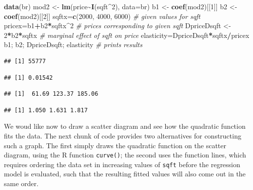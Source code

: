 \documentclass[
]{book}
\newenvironment{Shaded}{\begin{snugshade}}{\end{snugshade}}
\newcommand{\AttributeTok}[1]{\textcolor[rgb]{0.13,0.29,0.53}{#1}}
\newcommand{\CommentTok}[1]{\textcolor[rgb]{0.56,0.35,0.01}{\textit{#1}}}
\newcommand{\DecValTok}[1]{\textcolor[rgb]{0.00,0.00,0.81}{#1}}
\newcommand{\FunctionTok}[1]{\textcolor[rgb]{0.13,0.29,0.53}{\textbf{#1}}}
\newcommand{\NormalTok}[1]{#1}
\newcommand{\OtherTok}[1]{\textcolor[rgb]{0.56,0.35,0.01}{#1}}
\newcommand{\SpecialCharTok}[1]{\textcolor[rgb]{0.81,0.36,0.00}{\textbf{#1}}}
\begin{document}
\begin{Shaded}
\begin{Highlighting}[]
\FunctionTok{data}\NormalTok{(br)}
\NormalTok{mod2 }\OtherTok{\textless{}{-}} \FunctionTok{lm}\NormalTok{(price}\SpecialCharTok{\textasciitilde{}}\FunctionTok{I}\NormalTok{(sqft}\SpecialCharTok{\^{}}\DecValTok{2}\NormalTok{), }\AttributeTok{data=}\NormalTok{br)}
\NormalTok{b1 }\OtherTok{\textless{}{-}} \FunctionTok{coef}\NormalTok{(mod2)[[}\DecValTok{1}\NormalTok{]]}
\NormalTok{b2 }\OtherTok{\textless{}{-}} \FunctionTok{coef}\NormalTok{(mod2)[[}\DecValTok{2}\NormalTok{]]}
\NormalTok{sqftx}\OtherTok{=}\FunctionTok{c}\NormalTok{(}\DecValTok{2000}\NormalTok{, }\DecValTok{4000}\NormalTok{, }\DecValTok{6000}\NormalTok{)            }\CommentTok{\# given values for sqft}
\NormalTok{pricex}\OtherTok{=}\NormalTok{b1}\SpecialCharTok{+}\NormalTok{b2}\SpecialCharTok{*}\NormalTok{sqftx}\SpecialCharTok{\^{}}\DecValTok{2}                 \CommentTok{\# prices corresponding to given sqft }
\NormalTok{DpriceDsqft }\OtherTok{\textless{}{-}} \DecValTok{2}\SpecialCharTok{*}\NormalTok{b2}\SpecialCharTok{*}\NormalTok{sqftx            }\CommentTok{\# marginal effect of sqft on price}
\NormalTok{elasticity}\OtherTok{=}\NormalTok{DpriceDsqft}\SpecialCharTok{*}\NormalTok{sqftx}\SpecialCharTok{/}\NormalTok{pricex }
\NormalTok{b1; b2; DpriceDsqft; elasticity      }\CommentTok{\# prints results}
\end{Highlighting}
\end{Shaded}

\begin{verbatim}
## [1] 55777
\end{verbatim}

\begin{verbatim}
## [1] 0.01542
\end{verbatim}

\begin{verbatim}
## [1]  61.69 123.37 185.06
\end{verbatim}

\begin{verbatim}
## [1] 1.050 1.631 1.817
\end{verbatim}

We woud like now to draw a scatter diagram and see how the quadratic function fits the data. The next chunk of code provides two alternatives for constructing such a graph. The first simply draws the quadratic function on the scatter diagram, using the R function \texttt{curve()}; the second uses the function lines, which requires ordering the data set in increasing values of \texttt{sqft} before the regression model is evaluated, such that the resulting fitted values will also come out in the same order.
\end{document}
